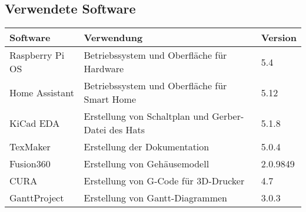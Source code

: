 \subsection{Verwendete Software}\label{qu_software}
\begin{tabularx}{\textwidth}{|p{5cm}|p{6cm}|p{3.2cm}|}
 	\hline 
 	\textbf{Software} & \textbf{Verwendung} & \textbf{Version} \\ 
 	\hline 
 	Raspberry Pi OS & Betriebssystem und Oberfläche für Hardware & 5.4 \\ 
 	\hline 
 	Home Assistant & Betriebssystem und Oberfläche für Smart Home & 5.12 \\ 
 	\hline 
 	KiCad EDA & Erstellung von Schaltplan und Gerber-Datei des Hats & 5.1.8 \\ 
 	\hline 
 	TexMaker & Erstellung der Dokumentation & 5.0.4 \\ 
 	\hline 
 	Fusion360 & Erstellung von Gehäusemodell & 2.0.9849 \\ 
 	\hline
 	CURA & Erstellung von G-Code für 3D-Drucker & 4.7 \\ 
 	\hline
 	GanttProject & Erstellung von Gantt-Diagrammen & 3.0.3 \\ 
 	\hline
\end{tabularx} 